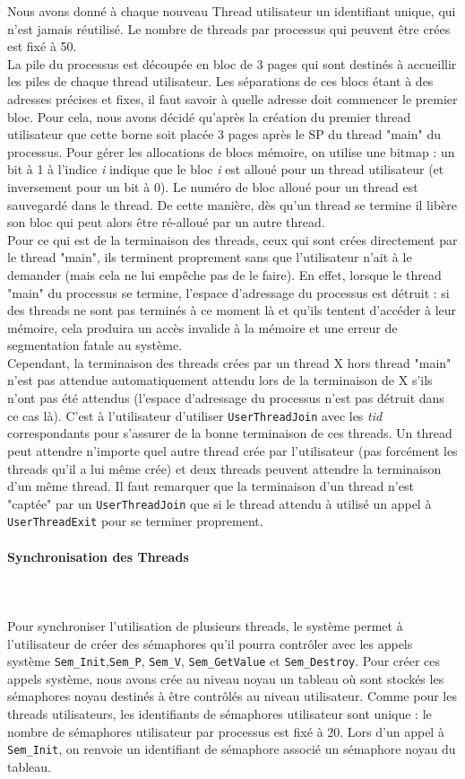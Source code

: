 \documentclass{report}
\newcommand{\myparagraph}[1]{\paragraph*{#1}\mbox{}\\}
\begin{document}
Nous avons donné à chaque nouveau Thread utilisateur un identifiant unique, qui n'est jamais réutilisé. Le nombre de threads par processus qui peuvent être crées est fixé à 50.\\

La pile du processus est découpée en bloc de 3 pages qui sont destinés à accueillir les piles de chaque thread utilisateur. Les séparations de ces blocs étant à des adresses précises et fixes, il faut savoir à quelle adresse doit commencer le premier bloc. Pour cela, nous avons décidé qu'après la création du premier thread utilisateur que cette borne soit placée 3 pages après le SP du thread "main" du processus. Pour gérer les allocations de blocs mémoire, on utilise une bitmap : un bit à 1 à l'indice \textit{i} indique que le bloc \textit{i} est alloué pour un thread utilisateur (et inversement pour un bit à 0). Le numéro de bloc alloué pour un thread est sauvegardé dans le thread. De cette manière, dès qu'un thread se termine il libère son bloc qui peut alors être ré-alloué par un autre thread. \\ 
   
Pour ce qui est de la terminaison des threads, ceux qui sont crées directement par le thread "main", ils terminent proprement sans que l'utilisateur n'ait à le demander (mais cela ne lui empêche pas de le faire). En effet, lorsque le thread "main" du processus se termine, l'espace d'adressage du processus est détruit : si des threads ne sont pas terminés à ce moment là et qu'ils tentent d'accéder à leur mémoire, cela produira un accès invalide à la mémoire et une erreur de segmentation fatale au système.\\
Cependant, la terminaison des threads crées par un thread X hors thread "main" n'est pas attendue automatiquement attendu lors de la terminaison de X s'ils n'ont pas été attendus (l'espace d'adressage du processus n'est pas détruit dans ce cas là). C'est à l'utilisateur d'utiliser \texttt{UserThreadJoin} avec les \textit{tid} correspondants pour s'assurer de la bonne terminaison de ces threads. Un thread peut attendre n'importe quel autre thread crée par l'utilisateur (pas forcément les threads qu'il a lui même crée) et deux threads peuvent attendre la terminaison d'un même thread. Il faut remarquer que la terminaison d'un thread n'est "captée" par un \texttt{UserThreadJoin} que si le thread attendu à utilisé un appel à \texttt{UserThreadExit} pour se terminer proprement.
 

\myparagraph{Synchronisation des Threads}\\
Pour synchroniser l'utilisation de plusieurs threads, le système permet à l'utilisateur de créer des sémaphores qu'il pourra contrôler avec les appels système \texttt{Sem\_Init},\texttt{Sem\_P}, \texttt{Sem\_V}, \texttt{Sem\_GetValue} et \texttt{Sem\_Destroy}. Pour créer ces appels système, nous avons crée au niveau noyau un tableau où sont stockés les sémaphores noyau destinés à être contrôlés au niveau utilisateur.  Comme pour les threads utilisateurs, les identifiants de sémaphores utilisateur sont unique : le nombre de sémaphores utilisateur par processus est fixé à 20. Lors d'un appel à \texttt{Sem\_Init}, on renvoie un identifiant de sémaphore associé un sémaphore noyau du tableau. \\
\end{document}
